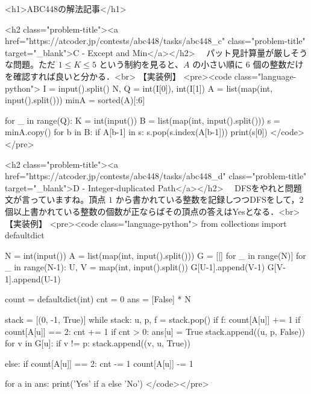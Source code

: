 <h1>ABC448の解法記事</h1>

<h2 class="problem-title"><a href="https://atcoder.jp/contests/abc448/tasks/abc448_c" class="problem-title" target="_blank">C - Except and Min</a></h2>
　パット見計算量が厳しそうな問題。ただ $1 \le K \le 5$ という制約を見ると、$A$ の小さい順に $6$ 個の整数だけを確認すれば良いと分かる．<br>
【実装例】
<pre><code class="language-python">
I = input().split()
N, Q = int(I[0]), int(I[1])
A = list(map(int, input().split()))
minA = sorted(A)[:6]

for _ in range(Q):
    K = int(input())
    B = list(map(int, input().split()))
    s = minA.copy()
    for b in B:
        if A[b-1] in s:
            s.pop(s.index(A[b-1]))
    print(s[0])
</code></pre>

<h2 class="problem-title"><a href="https://atcoder.jp/contests/abc448/tasks/abc448_d" class="problem-title" target="_blank">D - Integer-duplicated Path</a></h2>
　DFSをやれと問題文が言っていますね。頂点 $1$ から書かれている整数を記録しつつDFSをして，$2$ 個以上書かれている整数の個数が正ならばその頂点の答えはYesとなる．<br>
【実装例】
<pre><code class="language-python">
from collections import defaultdict

N = int(input())
A = list(map(int, input().split()))
G = [[] for _ in range(N)]
for _ in range(N-1):
    U, V = map(int, input().split())
    G[U-1].append(V-1)
    G[V-1].append(U-1)

count = defaultdict(int)
cnt = 0
ans = [False] * N

stack = [(0, -1, True)]
while stack:
    u, p, f = stack.pop()
    if f:
        count[A[u]] += 1
        if count[A[u]] == 2:
            cnt += 1
        if cnt > 0:
            ans[u] = True
        stack.append((u, p, False))
        for v in G[u]:
            if v != p:
                stack.append((v, u, True))
    
    else:
        if count[A[u]] == 2:
            cnt -= 1
        count[A[u]] -= 1

for a in ans:
    print('Yes' if a else 'No')
</code></pre>

